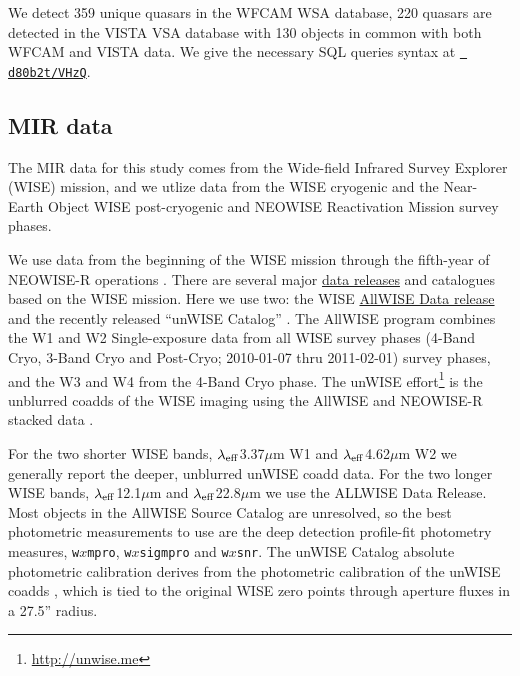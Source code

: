 \documentclass[usenatbib]{mnras}
\begin{document}
  We detect 359 unique quasars in the WFCAM WSA database, 220 quasars
  are detected in the VISTA VSA database with 130 objects in common with
  both WFCAM and VISTA data.  We give the necessary SQL queries syntax
  at \href{https://github.com/d80b2t/VHzQ/blob/master/data/WSA_VSA/SAMPLE_SQL_QUERIES}{\tt
    d80b2t/VHzQ}.
  

\subsection{MIR data}
The MIR data for this study comes from the Wide-field Infrared Survey Explorer (WISE) mission, and we utlize data from the WISE cryogenic and the Near-Earth Object WISE \citep[NEOWISE; ][]{Mainzer2011} post-cryogenic and NEOWISE Reactivation Mission \citep[NEOWISE-R][]{Mainzer2014} survey phases.

We use data from the beginning of the WISE mission \citep[2010 January; ][]{Wright2010} through the fifth-year of NEOWISE-R operations \citep[2018 December;]{Mainzer2011}.  There are several  major \href{https://irsa.ipac.caltech.edu/Missions/wise.html}{data releases} and catalogues based on the WISE mission. Here we use two: the WISE \href{http://wise2.ipac.caltech.edu/docs/release/allwise/}{AllWISE Data release} and the recently released ``unWISE Catalog'' \citet{Schlafly2019}. The AllWISE program combines the W1 and W2 Single-exposure data from all WISE survey phases (4-Band Cryo, 3-Band Cryo and Post-Cryo; 2010-01-07 thru 2011-02-01) survey phases, and the W3 and W4 from the 4-Band Cryo phase. The unWISE effort\footnote{\href{http://unwise.me}{http://unwise.me}} is the unblurred coadds of the WISE imaging using the AllWISE and NEOWISE-R stacked data \citep{Lang2014, Meisner2018a, Meisner2018b}.

For the two shorter WISE bands, $\lambda_{\rm eff}$3.37$\mu$m W1 and $\lambda_{\rm eff}$4.62$\mu$m W2 we generally report the deeper, unblurred unWISE coadd data.  For the two longer WISE bands, $\lambda_{\rm eff}$12.1$\mu$m and $\lambda_{\rm eff}$22.8$\mu$m we use the ALLWISE Data Release.  Most objects in the AllWISE Source Catalog are unresolved, so the best photometric measurements to use are the deep detection profile-fit photometry measures,  {\tt w$x$mpro},  {\tt w$x$sigmpro} and  {\tt w$x$snr}. The unWISE Catalog absolute photometric calibration derives from the photometric calibration of the unWISE coadds \citep{Meisner2017a}, which is tied to the original WISE zero points through aperture fluxes in a 27.5'' radius. 
\end{document}
